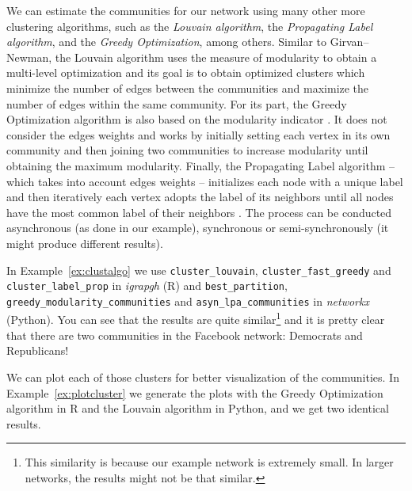 We can estimate the communities for our network using many other more clustering algorithms, such as the \emph{Louvain algorithm}, the \emph{Propagating Label algorithm}, and the \emph{Greedy Optimization}, among others. Similar to Girvan--Newman, the Louvain algorithm uses the measure of modularity to obtain a multi-level optimization \citep{blondel2008fast} and its goal is to obtain optimized clusters which minimize the number of edges between the communities and maximize the number of edges within the same community. For its part, the Greedy Optimization algorithm is also based on the modularity indicator \citep{clauset2004finding}. It does not consider the edges weights and works by initially setting each vertex in its own community and then joining two communities to increase modularity until obtaining the maximum modularity. Finally, the Propagating Label algorithm -- which takes into account edges weights -- initializes each node with a unique label and then iteratively each vertex adopts the label of its neighbors until all nodes have the most common label of their neighbors \citep{raghavan2007near}. The process can be conducted asynchronous (as done in our example), synchronous or semi-synchronously (it might produce different results).

In Example~\ref{ex:clustalgo} we use \texttt{cluster\_louvain}, \texttt{cluster\_fast\_greedy} and \texttt{cluster\_label\_prop} in \emph{igrapgh} (R) and \texttt{best\_partition}, \texttt{greedy\_modularity\_communities} and \texttt{asyn\_lpa\_communities} in \emph{networkx} (Python). You can see  that the results are quite similar\footnote{This similarity is because our example network is extremely small. In larger networks, the results might not be that similar.}  and it is pretty clear that there are two communities in the Facebook network: Democrats and Republicans!


We can plot each of those clusters for better visualization of the communities. In Example~\ref{ex:plotcluster} we generate the plots with the Greedy Optimization algorithm in R and the Louvain algorithm in Python, and we get two identical results.

